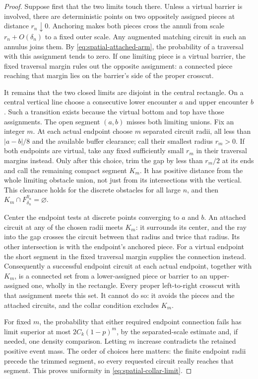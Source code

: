 \begin{proof}
Suppose first that the two limits touch there. Unless a virtual
barrier is involved, there are deterministic points on two
oppositely assigned pieces at distance $r_n\downarrow0$. Anchoring
makes both pieces cross the annuli from scale $r_n+O(\delta_n)$ to
a fixed outer scale. Any augmented matching circuit in such an
annulus joins them. By \eqref{eq:spatial-attached-arm}, the probability
of a traversal with this assignment tends to zero. If one limiting
piece is a virtual barrier, the fixed traversal margin rules out
the opposite assignment: a connected piece reaching that margin
lies on the barrier's side of the proper crosscut.

It remains that the two closed limits are disjoint in the central
rectangle. On a central vertical line choose a consecutive lower
encounter $a$ and upper encounter $b$. Such a transition exists
because the virtual bottom and top have those assignments. The open
segment $(a,b)$ misses both limiting unions. Fix an integer $m$.
At each actual endpoint choose $m$ separated circuit radii, all less
than $|a-b|/8$ and the available buffer clearance; call their smallest
radius $r_m>0$. If both endpoints are virtual, take any fixed
sufficiently small $r_m$ in their traversal margins instead.
Only after this choice, trim the gap by less than $r_m/2$ at its
ends and call the remaining compact segment $K_m$.
It has positive distance from the whole limiting obstacle union, not
just from its intersections with the vertical. This clearance holds
for the discrete obstacles for all large $n$, and then
$K_m\cap F_{\delta_n}^{\eta_n}=\varnothing$.

Center the endpoint tests at discrete points converging to $a$ and
$b$. An attached circuit at any of the chosen radii meets $K_m$:
it surrounds its center, and the ray into the gap crosses the circuit
between that radius and twice that radius. Its other intersection is
with the endpoint's anchored piece. For a virtual endpoint the short
segment in the fixed traversal margin supplies the connection instead.
Consequently a successful endpoint circuit at each actual endpoint,
together with $K_m$, is a connected set from a lower-assigned piece
or barrier to an upper-assigned one, wholly in the rectangle. Every
proper left-to-right crosscut with that assignment meets this set.
It cannot do so: it avoids the pieces and the attached circuits, and
the collar condition excludes $K_m$.

For fixed $m$, the probability that either required endpoint
connection fails has limit superior at most
$2C_k(1-p)^m$, by the separated-scale estimate and, if needed, one
density comparison. Letting $m$ increase contradicts the retained
positive event mass. The order of choices here matters: the finite
endpoint radii precede the trimmed segment, so every requested
circuit really reaches that segment. This proves uniformity in
\eqref{eq:spatial-collar-limit}.


\end{proof}
